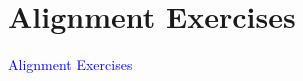 \documentclass[compress]{beamer}
\begin{document}

\section*{Alignment Exercises}

\begin{frame}
\begin{center}
\Huge \textcolor{blue}{Alignment Exercises}
\end{center}
\end{frame}
\end{document}
